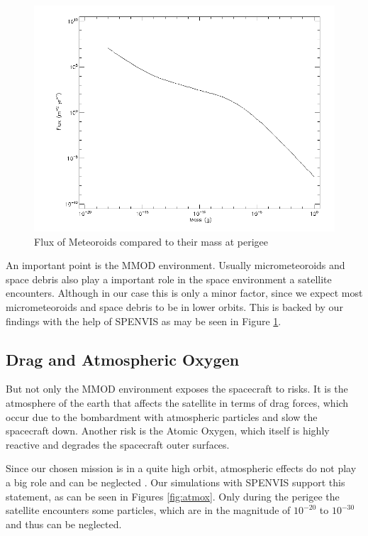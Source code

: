 \begin{figure}[H]
	\centering
	\includegraphics[width=\linewidth-15em]{spenvis/meteoroid_perigee}
		\caption{Flux of Meteoroids compared to their mass at perigee}
	\label{fig:perigee_mmod}
\end{figure}


An important point is the MMOD environment. Usually micrometeoroids and space debris also play a important role in the space environment a satellite encounters. Although in our case this is only a minor factor, since we expect most micrometeoroids and space debris to be in lower orbits. This is backed by our findings with the help of SPENVIS as may be seen in Figure \ref{fig:perigee_mmod}.



\subsection{Drag and Atmospheric Oxygen}
But not only the MMOD environment exposes the spacecraft to risks. It is the atmosphere of the earth that affects the satellite in terms of drag forces, which occur due to the bombardment with atmospheric particles and slow the spacecraft down. Another risk is the Atomic Oxygen, which itself is highly reactive and degrades the spacecraft outer surfaces.

Since our chosen mission is in a quite high orbit, atmospheric effects do not play a big role and can be neglected \citep{vallado2008}. Our simulations with SPENVIS support this statement, as can be seen in Figures \ref{fig:atmox}. Only during the perigee the satellite encounters some particles, which are in the magnitude of $10^{-20}$ to $10^{-30}$ and thus can be neglected.

